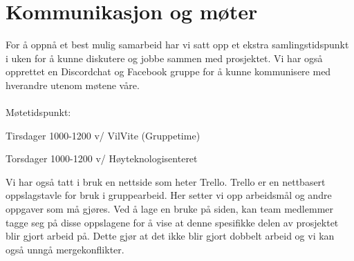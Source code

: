 \documentclass{article}
\begin{document}
\section*{Kommunikasjon og møter}
For å oppnå et best mulig samarbeid har vi satt opp et ekstra samlingstidspunkt i uken for å kunne diskutere og jobbe sammen med prosjektet. Vi har også opprettet en Discordchat og Facebook gruppe for å kunne kommunisere med hverandre utenom møtene våre.\\\\
Møtetidspunkt:
			\begin{list}{-}{}
				\item Tirsdager 1000-1200 v/ VilVite (Gruppetime) 
				\item Torsdager 1000-1200 v/ Høyteknologisenteret
			\end{list}

Vi har også tatt i bruk en nettside som heter Trello. Trello er en nettbasert oppslagstavle for bruk i gruppearbeid. Her setter vi opp arbeidsmål og andre oppgaver som må gjøres. Ved å lage en bruke på siden, kan team medlemmer tagge seg på disse oppslagene for å vise at denne spesifikke delen av prosjektet blir gjort arbeid på. Dette gjør at det ikke blir gjort dobbelt arbeid og vi kan også unngå mergekonflikter.
\end{document}
